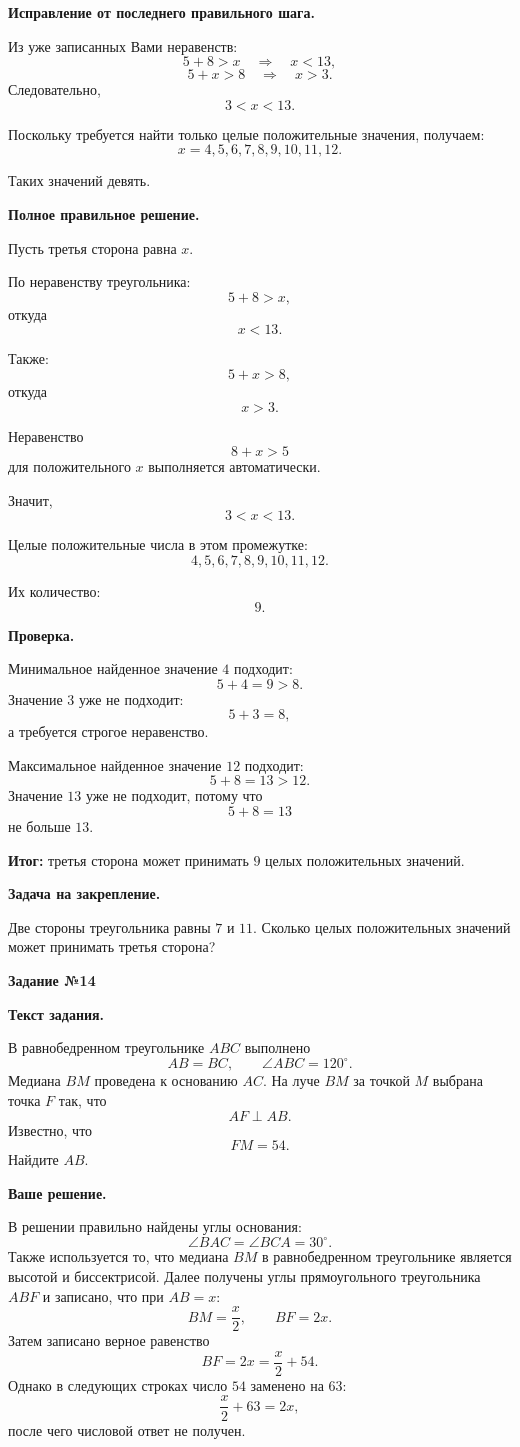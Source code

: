 \documentclass[12pt,a4paper]{article}
\newcommand{\tasktitle}[1]{%
  \phantomsection\label{task:#1}%
  {\LARGE\bfseries Задание №#1}\par
  \vspace{0.6em}
}
\begin{document}
\textbf{Исправление от последнего правильного шага.}

Из уже записанных Вами неравенств:
\[
5+8>x \quad\Rightarrow\quad x<13,
\]
\[
5+x>8 \quad\Rightarrow\quad x>3.
\]
Следовательно,
\[
3<x<13.
\]

Поскольку требуется найти только целые положительные значения, получаем:
\[
x=4,5,6,7,8,9,10,11,12.
\]

Таких значений девять.

\textbf{Полное правильное решение.}

Пусть третья сторона равна $x$.

По неравенству треугольника:
\[
5+8>x,
\]
откуда
\[
x<13.
\]

Также:
\[
5+x>8,
\]
откуда
\[
x>3.
\]

Неравенство
\[
8+x>5
\]
для положительного $x$ выполняется автоматически.

Значит,
\[
3<x<13.
\]

Целые положительные числа в этом промежутке:
\[
4,5,6,7,8,9,10,11,12.
\]

Их количество:
\[
9.
\]

\textbf{Проверка.}

Минимальное найденное значение $4$ подходит:
\[
5+4=9>8.
\]
Значение $3$ уже не подходит:
\[
5+3=8,
\]
а требуется строгое неравенство.

Максимальное найденное значение $12$ подходит:
\[
5+8=13>12.
\]
Значение $13$ уже не подходит, потому что
\[
5+8=13
\]
не больше $13$.

\textcolor{teal!60!black}{\textbf{Итог:}} третья сторона может принимать $9$ целых положительных значений.

\textbf{Задача на закрепление.}

Две стороны треугольника равны $7$ и $11$. Сколько целых положительных значений может принимать третья сторона?

\newpage
\tasktitle{14}

\textbf{Текст задания.}

В равнобедренном треугольнике $ABC$ выполнено
\[
AB=BC,\qquad \angle ABC=120^\circ.
\]
Медиана $BM$ проведена к основанию $AC$. На луче $BM$ за точкой $M$ выбрана точка $F$ так, что
\[
AF\perp AB.
\]
Известно, что
\[
FM=54.
\]
Найдите $AB$.

\textbf{Ваше решение.}

В решении правильно найдены углы основания:
\[
\angle BAC=\angle BCA=30^\circ.
\]
Также используется то, что медиана $BM$ в равнобедренном треугольнике является высотой и биссектрисой. Далее получены углы прямоугольного треугольника $ABF$ и записано, что при $AB=x$:
\[
BM=\frac{x}{2},\qquad BF=2x.
\]
Затем записано верное равенство
\[
BF=2x=\frac{x}{2}+54.
\]
Однако в следующих строках число $54$ заменено на $63$:
\[
\frac{x}{2}+63=2x,
\]
после чего числовой ответ не получен.
\end{document}
